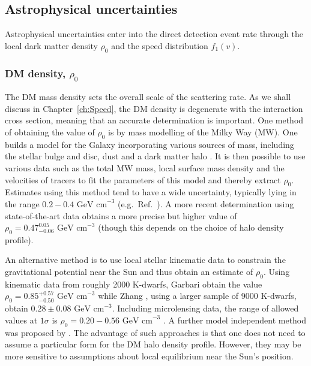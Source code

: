 
\subsection{Astrophysical uncertainties}
\label{sec:DD:astrounc}

Astrophysical uncertainties enter into the direct detection event rate through the local dark matter density $\rho_0$ and the speed distribution $f_1(v)$. 

\subsubsection{DM density, $\rho_0$}

The DM mass density sets the overall scale of the scattering rate. As we shall discuss in Chapter~\ref{ch:Speed}, the DM density is degenerate with the interaction cross section, meaning that an accurate determination is important. One method of obtaining the value of $\rho_0$ is by mass modelling of the Milky Way (MW). One builds a model for the Galaxy incorporating various sources of mass, including the stellar bulge and disc, dust and a dark matter halo \cite{Catena:2010}. It is then possible to use various data such as the total MW mass, local surface mass density and the velocities of tracers to fit the parameters of this model and thereby extract $\rho_0$. Estimates using this method tend to have a wide uncertainty, typically lying in the range \(0.2 - 0.4 \textrm{ GeV cm}^{-3}\) (e.g.\ Ref.\ \cite{Catena:2010,Weber:2010}). A more recent determination using state-of-the-art data obtains a more precise but higher value of $\rho_0 = 0.47_{-0.06}^{0.05} \textrm{ GeV cm}^{-3}$ \cite{Nesti:2013} (though this depends on the choice of halo density profile). 

An alternative method is to use local stellar kinematic data to constrain the gravitational potential near the Sun and thus obtain an estimate of $\rho_0$. Using kinematic data from roughly 2000 K-dwarfs, Garbari \etal \cite{Garbari:2012} obtain the value \(\rho_0 = 0.85_{-0.50}^{+0.57} \textrm{ GeV cm}^{-3}\) while Zhang \etal, using a larger sample of 9000 K-dwarfs, obtain $0.28\pm0.08 \textrm{ GeV cm}^{-3}$. Including microlensing data, the range of allowed values at $1\sigma$ is $\rho_0 = 0.20-0.56 \textrm{ GeV cm}^{-3}$ \cite{Iocco:2011}. A further model independent method was proposed by \cite{Salucci:2010}. The advantage of such approaches is that one does not need to assume a particular form for the DM halo density profile. However, they may be more sensitive to assumptions about local equilibrium near the Sun's position.

